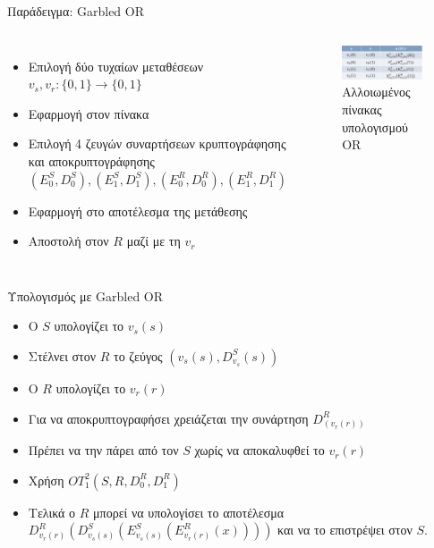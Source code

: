 \documentclass{beamer}
\begin{document}
\begin{frame}{Παράδειγμα: Garbled OR}
	\begin{columns}
		\begin{itemize}
			\item Επιλογή δύο τυχαίων μεταθέσεων $v_s, v_r : \{0,1\} \rightarrow \{0,1\} $ 
			\item Εφαρμογή στον πίνακα
			\item Επιλογή 4 ζευγών συναρτήσεων κρυπτογράφησης και αποκρυπτογράφησης 
			$(E_0^S, D_0^S), (E_1^S, D_1^S), (E_0^R, D_0^R), (E_1^R, D_1^R)$
			\item Εφαρμογή στο αποτέλεσμα της μετάθεσης
			\item Αποστολή στον $R$ μαζί με τη $v_r$
		\end{itemize}
		\begin{figure}
			\centering
			\includegraphics[width=1.2\textwidth]{ot_garbled_or.png}
			\caption{Αλλοιωμένος πίνακας υπολογισμού OR}
		\end{figure}
	\end{columns}	
\end{frame}

\begin{frame}{Υπολογισμός με Garbled OR}
	\begin{itemize}
		\item Ο $S$ υπολογίζει το $v_s(s)$ 
		\item Στέλνει στον $R$ το ζεύγος $(v_s(s),D_{v_s}^{S}(s))$
		\item O $R$ υπολογίζει το $v_r(r)$
		\item Για να αποκρυπτογραφήσει χρειάζεται την συνάρτηση $D_{(v_r(r))}^R$
		\item Πρέπει να την πάρει από τον $S$ \alert{χωρίς} να αποκαλυφθεί το $v_r(r)$
		\item Χρήση ${OT}_1^2(S,R,D_0^R,D_1^R)$
		\item Τελικά ο $R$ μπορεί να υπολογίσει το αποτέλεσμα $D^R_{v_r(r)}(D^S_{v_s(s)}(E^S_{v_s(s)}(E^R_{v_r(r)}(x))))$ και να το επιστρέψει στον $S$.
	\end{itemize}
\end{frame}
\end{document}
